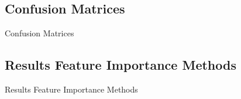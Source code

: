 \subsection{Confusion Matrices}
\label{ssec:cm}
\begin{table}[H]
\begin{footnotesize}

\end{footnotesize}
\caption{\label{tab:cm} Confusion Matrices}
\end{table}

\subsection{Results Feature Importance Methods}
\label{ssec:fi}
\begin{table}[H]
\begin{footnotesize}

\end{footnotesize}
\caption{\label{tab:fi} Results Feature Importance Methods}
\end{table}
